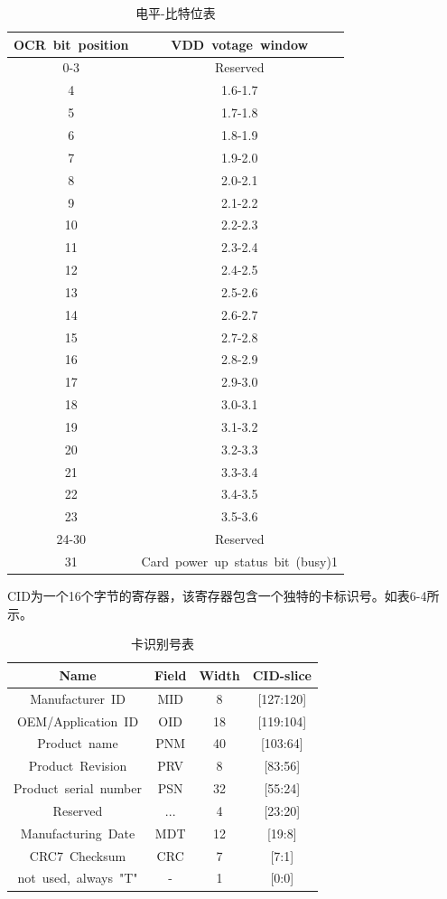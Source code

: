 \begin{table}
    \centering
\begin{tabular}{|c|c|}
    \hline
OCR~bit~position&VDD~votage~window\\
\hline
0-3	&Reserved\\
\hline
4	&1.6-1.7\\
\hline
5	&1.7-1.8\\
\hline
6	&1.8-1.9\\
\hline
7	&1.9-2.0\\
\hline
8	&2.0-2.1\\
\hline
9	&2.1-2.2\\
\hline
10	&2.2-2.3\\
\hline
11	&2.3-2.4\\
\hline
12	&2.4-2.5\\
\hline
13	&2.5-2.6\\
\hline
14	&2.6-2.7\\
\hline
15	&2.7-2.8\\
\hline
16	&2.8-2.9\\
\hline
17	&2.9-3.0\\
\hline
18	&3.0-3.1\\
\hline
19	&3.1-3.2\\
\hline
20	&3.2-3.3\\
\hline
21	&3.3-3.4\\
\hline
22	&3.4-3.5\\
\hline
23	&3.5-3.6\\
\hline
24-30	&Reserved\\
\hline
31	&Card~power~up~status~bit~(busy)1\\
\hline
\end{tabular}
\caption{电平-比特位表}
\end{table}

CID为一个16个字节的寄存器，该寄存器包含一个独特的卡标识号。如表6-4所示。

\begin{table}
    \centering
\begin{tabular}{|c|c|c|c|}
    \hline
    Name	            &Field	&Width	&CID-slice\\
    \hline
    Manufacturer~ID	    &MID     &8	    &[127:120]\\
    \hline
    OEM/Application~ID	&OID     &18	    &[119:104]\\
    \hline
    Product~name	    &PNM	    &40	    &[103:64]\\
    \hline
    Product~Revision	&PRV     &8	    &[83:56]\\
    \hline
    Product~serial~number	&PSN &32	    &[55:24]\\
    \hline
    Reserved	        &...	    &4	    &[23:20]\\
    \hline
    Manufacturing~Date	&MDT     &12	    &[19:8]\\
    \hline
    CRC7~Checksum	    &CRC	    &7	    &[7:1]\\
    \hline
    not~used,~always~"T"&-	    &1	    &[0:0]\\
    \hline
\end{tabular}
\caption{卡识别号表}
\end{table}

